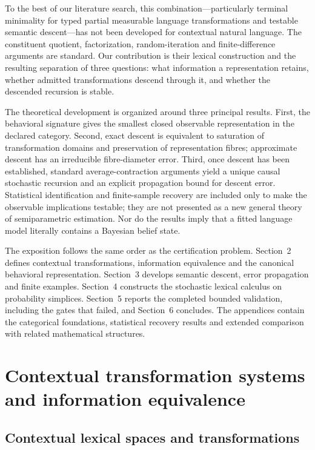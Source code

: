 \documentclass[11pt]{article}
\begin{document}
To the best of our literature search, this combination---particularly terminal
minimality for typed partial measurable language transformations and testable
semantic descent---has not been developed for contextual natural language.
The constituent quotient, factorization, random-iteration and finite-difference
arguments are standard.  Our contribution is their lexical construction and
the resulting separation of three questions: what information a representation
retains, whether admitted transformations descend through it, and whether the
descended recursion is stable.

The theoretical development is organized around three principal results.
First, the behavioral
signature gives the smallest closed observable representation in the declared
category.  Second, exact descent is equivalent to saturation of transformation
domains and preservation of representation fibres; approximate descent has an
irreducible fibre-diameter error.  Third, once descent has been established,
standard average-contraction arguments yield a unique causal stochastic
recursion and an explicit propagation bound for descent error.  Statistical
identification and finite-sample recovery are included only to make the
observable implications testable; they are not presented as a new general
theory of semiparametric estimation.  Nor do the results imply that a fitted
language model literally contains a Bayesian belief state.

The exposition follows the same order as the certification problem.
Section~2 defines contextual transformations, information equivalence and the
canonical behavioral representation.  Section~3 develops semantic descent,
error propagation and finite examples.  Section~4 constructs the stochastic
lexical calculus on probability simplices.  Section~5 reports the completed
bounded validation, including the gates that failed, and Section~6 concludes.
The appendices contain the categorical foundations, statistical recovery
results and extended comparison with related mathematical structures.

\section{Contextual transformation systems and information equivalence}

\subsection{Contextual lexical spaces and transformations}
\end{document}
